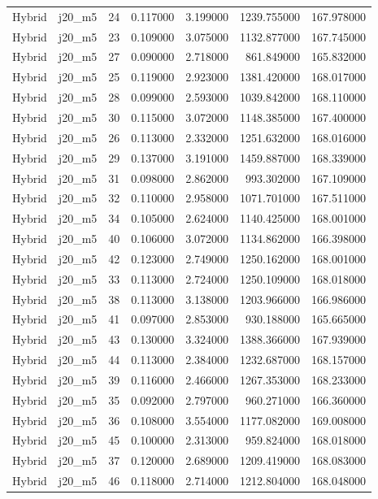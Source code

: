\begin{tabular}{llrrrrr}
Hybrid & j20_m5 & 24 & 0.117000 & 3.199000 & 1239.755000 & 167.978000 \\
Hybrid & j20_m5 & 23 & 0.109000 & 3.075000 & 1132.877000 & 167.745000 \\
Hybrid & j20_m5 & 27 & 0.090000 & 2.718000 & 861.849000 & 165.832000 \\
Hybrid & j20_m5 & 25 & 0.119000 & 2.923000 & 1381.420000 & 168.017000 \\
Hybrid & j20_m5 & 28 & 0.099000 & 2.593000 & 1039.842000 & 168.110000 \\
Hybrid & j20_m5 & 30 & 0.115000 & 3.072000 & 1148.385000 & 167.400000 \\
Hybrid & j20_m5 & 26 & 0.113000 & 2.332000 & 1251.632000 & 168.016000 \\
Hybrid & j20_m5 & 29 & 0.137000 & 3.191000 & 1459.887000 & 168.339000 \\
Hybrid & j20_m5 & 31 & 0.098000 & 2.862000 & 993.302000 & 167.109000 \\
Hybrid & j20_m5 & 32 & 0.110000 & 2.958000 & 1071.701000 & 167.511000 \\
Hybrid & j20_m5 & 34 & 0.105000 & 2.624000 & 1140.425000 & 168.001000 \\
Hybrid & j20_m5 & 40 & 0.106000 & 3.072000 & 1134.862000 & 166.398000 \\
Hybrid & j20_m5 & 42 & 0.123000 & 2.749000 & 1250.162000 & 168.001000 \\
Hybrid & j20_m5 & 33 & 0.113000 & 2.724000 & 1250.109000 & 168.018000 \\
Hybrid & j20_m5 & 38 & 0.113000 & 3.138000 & 1203.966000 & 166.986000 \\
Hybrid & j20_m5 & 41 & 0.097000 & 2.853000 & 930.188000 & 165.665000 \\
Hybrid & j20_m5 & 43 & 0.130000 & 3.324000 & 1388.366000 & 167.939000 \\
Hybrid & j20_m5 & 44 & 0.113000 & 2.384000 & 1232.687000 & 168.157000 \\
Hybrid & j20_m5 & 39 & 0.116000 & 2.466000 & 1267.353000 & 168.233000 \\
Hybrid & j20_m5 & 35 & 0.092000 & 2.797000 & 960.271000 & 166.360000 \\
Hybrid & j20_m5 & 36 & 0.108000 & 3.554000 & 1177.082000 & 169.008000 \\
Hybrid & j20_m5 & 45 & 0.100000 & 2.313000 & 959.824000 & 168.018000 \\
Hybrid & j20_m5 & 37 & 0.120000 & 2.689000 & 1209.419000 & 168.083000 \\
Hybrid & j20_m5 & 46 & 0.118000 & 2.714000 & 1212.804000 & 168.048000 \\

\end{tabular}
